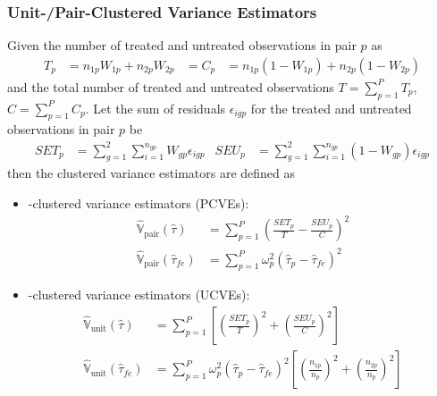 \documentclass[twoside]{article}
\begin{document}
\subsubsection{Unit-/Pair-Clustered Variance Estimators}
Given the number of treated and untreated observations in pair $p$ as 
\begin{align*}
    T_p &= n_{1p}W_{1p} + n_{2p}W_{2p} &= C_p &= n_{1p}\left(1-W_{1p}\right) + n_{2p}\left(1-W_{2p}\right)
\end{align*}
and the total number of treated and untreated observations $T=\sum^P_{p=1}T_p$, $C=\sum^P_{p=1}C_p$.
Let the sum of residuals $\epsilon_{igp}$ for the treated and untreated observations in pair $p$ be 
\begin{align*}
    SET_p &= \sum^2_{g=1}\sum^{n_{gp}}_{i=1} W_{gp}\epsilon_{igp} & SEU_p &= \sum^2_{g=1}\sum^{n_{gp}}_{i=1} \left(1-W_{gp}\right)\epsilon_{igp}
\end{align*}
then the clustered variance estimators are defined as 
\begin{itemize}
    \item {}-clustered variance estimators (PCVEs):
    \begin{align*}
        \hat{\mathbb{V}}_{\text{pair}}\left(\hat{\tau}\right) &= \sum^P_{p=1}\left(\frac{SET_p}{T} - \frac{SEU_p}{C} \right)^2 \\
        \hat{\mathbb{V}}_{\text{pair}}\left(\hat{\tau}_{fe}\right) &= \sum^P_{p=1} \omega^2_p \left(\hat{\tau}_p - \hat{\tau}_{fe}\right)^2
    \end{align*}
    \item {}-clustered variance estimators (UCVEs):
    \begin{align*}
        \hat{\mathbb{V}}_{\text{unit}}\left(\hat{\tau}\right) &= \sum^P_{p=1}\left[ \left(\frac{SET_p}{T}\right)^2 + \left(\frac{SEU_p}{C}\right)^2 \right] \\
        \hat{\mathbb{V}}_{\text{unit}}\left(\hat{\tau}_{fe}\right) &= \sum^P_{p=1}\omega^2_p \left(\hat{\tau}_p-\hat{\tau}_{fe}\right)^2 \left[ \left(\frac{n_{1p}}{n_p}\right)^2 + \left(\frac{n_{2p}}{n_p}\right)^2 \right]
    \end{align*}
\end{itemize}
\end{document}
